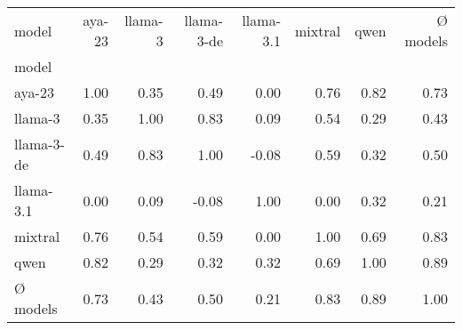 \begin{tabular}{lrrrrrrr}
\toprule
model & aya-23 & llama-3 & llama-3-de & llama-3.1 & mixtral & qwen & Ø models \\
model &  &  &  &  &  &  &  \\
\midrule
aya-23 & 1.00 & 0.35 & 0.49 & 0.00 & 0.76 & 0.82 & 0.73 \\
llama-3 & 0.35 & 1.00 & 0.83 & 0.09 & 0.54 & 0.29 & 0.43 \\
llama-3-de & 0.49 & 0.83 & 1.00 & -0.08 & 0.59 & 0.32 & 0.50 \\
llama-3.1 & 0.00 & 0.09 & -0.08 & 1.00 & 0.00 & 0.32 & 0.21 \\
mixtral & 0.76 & 0.54 & 0.59 & 0.00 & 1.00 & 0.69 & 0.83 \\
qwen & 0.82 & 0.29 & 0.32 & 0.32 & 0.69 & 1.00 & 0.89 \\
Ø models & 0.73 & 0.43 & 0.50 & 0.21 & 0.83 & 0.89 & 1.00 \\
\bottomrule
\end{tabular}
